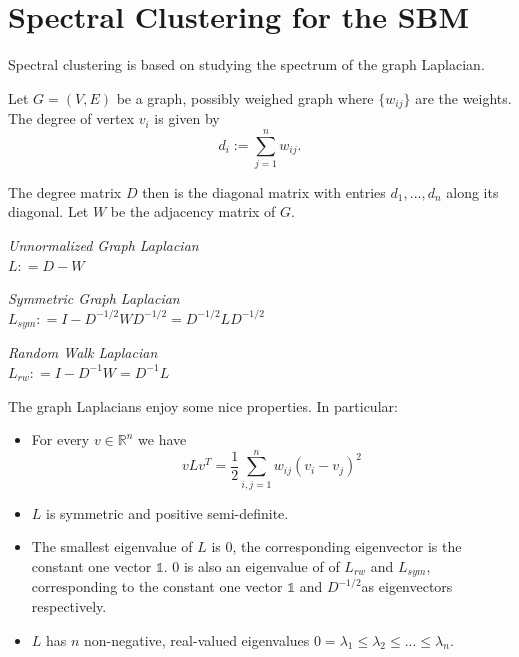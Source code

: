 \section{Spectral Clustering for the SBM}

Spectral clustering is based on studying the spectrum of the graph Laplacian.  


Let $G= (V, E)$ be a graph, possibly weighed graph where $\{w_{ij}\}$ are the weights.  The degree of vertex $v_i$ is given by 
$$ d_i := \sum_{j=1}^n w_{ij}.$$

The degree matrix $D$ then is the diagonal matrix with entries $d_1, ..., d_n$ along its diagonal. Let $W$ be the adjacency matrix of $G$.  

\begin{definition}\textit{ Unnormalized Graph Laplacian}\\

$L : = D-W$ 
\end{definition}
\begin{definition}\textit{ Symmetric Graph Laplacian}\\

$L_{sym} : = I - D^{-1/2}WD^{-1/2} = D^{-1/2}LD^{-1/2}$ 
\end{definition}
\begin{definition}\textit{ Random Walk Laplacian}\\

$L_{rw} : = I - D^{-1}W = D^{-1}L$ 
\end{definition}

The graph Laplacians enjoy some nice properties.  In particular: 

\begin{prop}\cite{tutorial_SC}
\begin{itemize}
    \item For every $v \in \mathbb{R}^n$ we have
    $$v L v^T = \frac{1}{2}\sum_{i,j =1}^nw_{ij}(v_i-v_j)^2$$
    \item $L$ is symmetric and positive semi-definite.
    \item The smallest eigenvalue of $L$ is 0, the corresponding eigenvector is the constant one vector $\mathbb{1}$. $0$ is also an eigenvalue of of $L_{rw}$ and $L_{sym}$, corresponding to the constant one vector $\mathbb{1}$ and $D^{-1/2}$as eigenvectors respectively. 
    \item $L$ has $n$ non-negative, real-valued eigenvalues $0 = \lambda_1 \leq \lambda_2 \leq ...\leq \lambda_n$. 
\end{itemize}
\end{prop}

